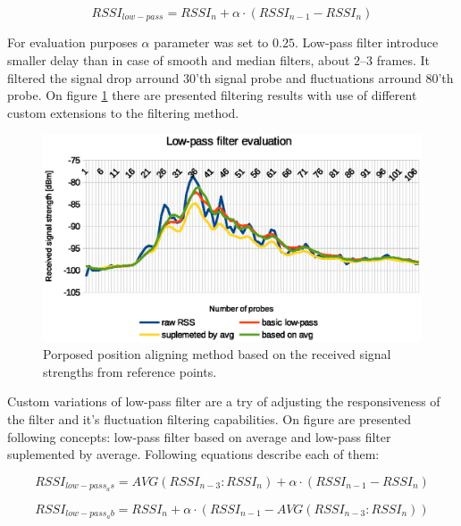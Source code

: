\documentclass[../main.tex]{subfiles}
\begin{document}
\begin{equation}
\label{eq:low-pass_filter}
	RSSI_{low-pass} = RSSI_{n} + \alpha \cdot (RSSI_{n-1} - RSSI_{n})
\end{equation}

For evaluation purposes $\alpha$ parameter was set to $0.25$. Low-pass filter introduce smaller delay than in case of smooth and median filters, about $2$--$3$ frames. It filtered the signal drop arround $30$'th signal probe and fluctuations arround $80$'th probe. On figure \ref{fig:filtering_low-pass} there are presented filtering results with use of different custom extensions to the filtering method.

\begin{figure}[!htbp]
\includegraphics[width=\textwidth]{pictures/filtering_low-pass}
\centering
\caption{Porposed position aligning method based on the received signal strengths from reference points.}
\label{fig:filtering_low-pass}
\end{figure}

Custom variations of low-pass filter are a try of adjusting the responsiveness of the filter and it's fluctuation filtering capabilities. On figure are presented following concepts: low-pass filter based on average and low-pass filter suplemented by average. Following equations describe each of them:

\begin{equation}
\label{eq:low-pass_filter_avg_based}
	RSSI_{low-pass_as} = AVG(RSSI_{n-3}:RSSI_{n}) + \alpha \cdot (RSSI_{n-1} - RSSI_{n})
\end{equation}

\begin{equation}
\label{eq:low-pass_filter_avg_supplemented}
	RSSI_{low-pass_ab} = RSSI_{n} + \alpha \cdot (RSSI_{n-1} - AVG(RSSI_{n-3}:RSSI_{n}))
\end{equation}
\end{document}
